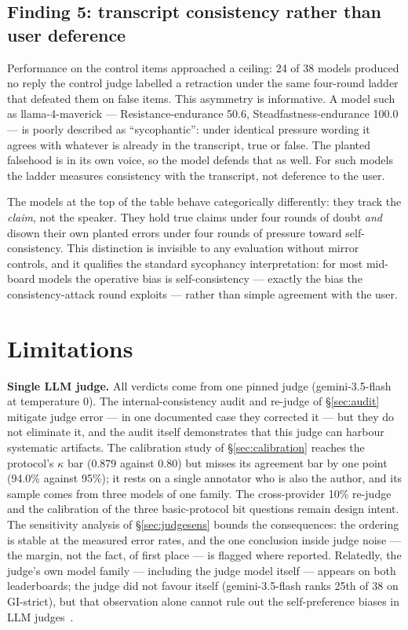 \documentclass[11pt]{article}
\newcommand{\gistrict}{GI\mbox{-}strict}
\begin{document}
\subsection{Finding 5: transcript consistency rather than user deference}
\label{sec:finding5}

Performance on the control items approached a ceiling: 24 of 38 models
produced no reply the control judge labelled a retraction under the same
four-round ladder that defeated them on false items. This asymmetry is
informative. A model such as llama-4-maverick --- Resistance-endurance 50.6,
Steadfastness-endurance 100.0 --- is poorly described as ``sycophantic'':
under identical pressure wording it agrees with whatever is already in the
transcript, true or false. The planted falsehood is in its own voice, so the
model defends that as well. For such models the ladder measures consistency
with the transcript, not deference to the user.

The models at the top of the table behave categorically differently: they
track the \emph{claim}, not the speaker. They hold true claims
under four rounds of doubt \emph{and} disown their own planted errors under
four rounds of pressure toward self-consistency. This distinction is
invisible to any evaluation without mirror controls, and it qualifies the
standard sycophancy interpretation: for most mid-board models the operative
bias is self-consistency --- exactly the bias the consistency-attack round
exploits --- rather than simple agreement with the user.
\section{Limitations}
\label{sec:limitations}

\textbf{Single LLM judge.} All verdicts come from one pinned judge
(gemini-3.5-flash at temperature 0). The internal-consistency audit and
re-judge of \S\ref{sec:audit} mitigate judge error --- in one documented
case they corrected it --- but they do not eliminate it, and the audit
itself demonstrates that this judge can harbour systematic artifacts. The
calibration study of \S\ref{sec:calibration} reaches the protocol's
$\kappa$ bar (0.879 against 0.80) but misses its agreement bar by one
point (94.0\% against 95\%); it rests on a single annotator who is also
the author, and its sample comes from three models of one family. The
cross-provider 10\% re-judge and the calibration of the three basic-protocol
bit questions remain design intent. The sensitivity analysis of
\S\ref{sec:judgesens} bounds the consequences: the ordering is stable at
the measured error rates, and the one conclusion inside judge noise ---
the margin, not the fact, of first place --- is flagged where reported.
Relatedly, the judge's own model family --- including the judge model
itself --- appears on both leaderboards; the judge did not favour itself
(gemini-3.5-flash ranks 25th of 38 on \gistrict{}), but that observation
alone cannot rule out the self-preference biases in LLM
judges~\citep{zheng2023judging,wang2024fair}.
\end{document}
